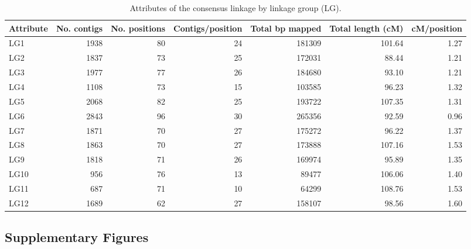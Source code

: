 \documentclass[smallextended]{svjour3}
\begin{document}
\clearpage
\begin{landscape}
\begin{table}[ht]
\caption{Attributes of the consensus linkage by linkage group (LG).} 
\begin{tabular}{lrrrrrr}
  \toprule
  Attribute & No. contigs & No. positions & Contigs/position & Total bp mapped & Total length (cM) & cM/position \\
  \midrule
  LG1 & 1938 & 80 & 24 & \num{181309} & 101.64 & 1.27 \\
  LG2 & 1837 & 73 & 25 & \num{172031} & 88.44 & 1.21 \\
  LG3 & 1977 & 77 & 26 & \num{184680} & 93.10 & 1.21 \\
  LG4 & 1108 & 73 & 15 & \num{103585} & 96.23 & 1.32 \\
  LG5 & 2068 & 82 & 25 & \num{193722} & 107.35 & 1.31 \\
  LG6 & 2843 & 96 & 30 & \num{265356} & 92.59 & 0.96 \\
  LG7 & 1871 & 70 & 27 & \num{175272} & 96.22 & 1.37 \\
  LG8 & 1863 & 70 & 27 & \num{173888} & 107.16 & 1.53 \\
  LG9 & 1818 & 71 & 26 & \num{169974} & 95.89 & 1.35 \\
  LG10 & 956 & 76 & 13 & \num{89477} & 106.06 & 1.40 \\
  LG11 & 687 & 71 & 10 & \num{64299} & 108.76 & 1.53 \\
  LG12 & 1689 & 62 & 27 & \num{158107} & 98.56 & 1.60 \\
  \bottomrule
\end{tabular}
\label{t:label}
\end{table}
\end{landscape}

\subsection*{Supplementary Figures}\label{ss:supp}
\end{document}

